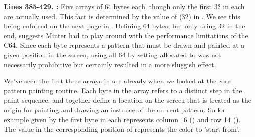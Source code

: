 \textbf{Lines 385-429. :} Five arrays of 64 bytes each, though only the first 32 in each are actually used. This fact is determined
by the value of  (32) in . We see this being enforced on the next page in
. Defining 64 bytes, but only using 32 in the end, suggests Minter had to play around
with the performance limitations of the C64. Since each byte represents a pattern that must be drawn and painted
at a given position in the screen, using all 64 by setting allocated  to  
was not necessarily prohibitive but certainly resulted in a more sluggish effect.

We've seen the first three arrays in use already when we looked at the core
pattern painting routine. Each byte in the array refers to a distinct step in the paint sequence.
 and  together define a location on the screen
that is treated as the origin for painting and drawing an instance of the current pattern. So for example  given by the
first byte in each represents column 16 () and row 14 (). The value in
the corresponding position of  represents the color to 'start from'.


